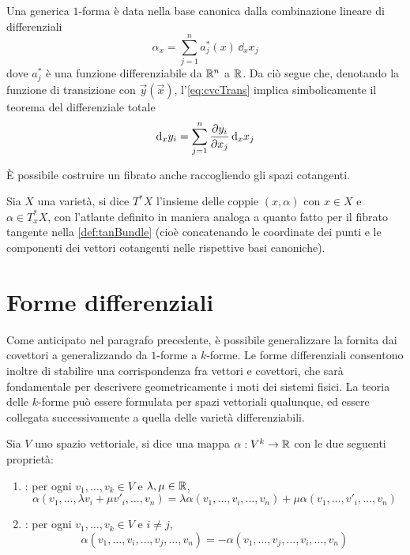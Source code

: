 Una generica $1$-forma è data nella base canonica dalla combinazione lineare di differenziali \begin{equation}
\alpha_x = \sum_{j=1}^{n} a^*_j(x)\, \dd_x x_j
\end{equation} 
dove $a_j^*$ è una funzione differenziabile da $\mathbb{R}^{n}$ a $\mathbb{R}$. Da ciò segue che, denotando la funzione di transizione con $\vec{y}(\vec{x})$, l'\autoref{eq:cvcTrans} implica simbolicamente il teorema del differenziale totale \begin{equation}
\dd_x y_i = \sum_{j=1}^{n} \pdv{y_i}{x_j}\, \dd_x x_j
\end{equation} 

È possibile costruire un fibrato anche raccogliendo gli spazi cotangenti.

\begin{definition}
  Sia $X$ una varietà, si dice  $T^*X$ l'insieme delle coppie $(x,\alpha)$ con $x \in X$ e $\alpha \in T^*_x X$, con l'atlante definito in maniera analoga a quanto fatto per il fibrato tangente nella \autoref{def:tanBundle} (cioè concatenando le coordinate dei punti e le componenti dei vettori cotangenti nelle rispettive basi canoniche).
\end{definition}

\section{Forme differenziali}
Come anticipato nel paragrafo precedente, è possibile generalizzare la  fornita dai covettori a  generalizzando da $1$-forme a $k$-forme. Le forme differenziali consentono inoltre di stabilire una corrispondenza fra vettori e covettori, che sarà fondamentale per descrivere geometricamente i moti dei sistemi fisici. La teoria delle $k$-forme può essere formulata per spazi vettoriali qualunque, ed essere collegata successivamente a quella delle varietà differenziabili.

\begin{definition}
  Sia $V$ uno spazio vettoriale, si dice  una mappa $\alpha: V^k \to \mathbb{R}$ con le due seguenti proprietà:
  \begin{enumerate}
    \item {}: per ogni $v_1, \ldots, v_k \in V$ e $\lambda,\mu \in \mathbb{R}$, \begin{equation}
      \alpha(v_1, \ldots, \lambda v_i + \mu v'_i, \ldots, v_n) = \lambda \alpha(v_1, \ldots, v_i, \ldots, v_n) + \mu \alpha(v_1, \ldots, v'_i, \ldots, v_n)
    \end{equation} 
    \item {}: per ogni $v_1, \ldots, v_k \in V$ e $i\neq j$, \begin{equation}
    \alpha(v_1, \ldots, v_i, \ldots, v_j, \ldots, v_n) = 
    - \alpha(v_1, \ldots, v_j, \ldots, v_i, \ldots, v_n)
    \end{equation} 
  \end{enumerate}
\end{definition}

